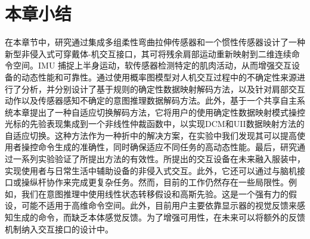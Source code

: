 \section{本章小结}在本章节中，研究通过集成多组柔性弯曲拉伸传感器和一个惯性传感器设计了一种新型非侵入式可穿戴体-机交互接口，其可将残余肩部运动重新映射到二维连续命令空间。IMU 捕捉上半身运动，软传感器检测特定的肌肉活动，从而增强交互设备的动态性能和可靠性。通过使用概率图模型对人机交互过程中的不确定性来源进行了分析，并分别设计了基于规则的确定性数据映射解码方法，以及针对肩部交互动作以及传感器感知不确定的意图推理数据解码方法。此外，基于一个共享自主系统本章提出了一种自适应切换解码方法，它将用户的使用确定性数据映射模式操控光标的先验表现集成到一个非线性仲裁函数中，以实现DCM和UII数据映射方法的自适应切换。这种方法作为一种折中的解决方案，在实验中我们发现其可以提高使用者操控命令生成的准确性，同时确保适应不同任务的高动态性能。最后，研究通过一系列实验验证了所提出方法的有效性。所提出的交互设备在未来融入服装中，实现使用者与日常生活中辅助设备的非侵入式交互。此外，它还可以通过与脑机接口或操纵杆协作来完成更复杂任务。然而，目前的工作仍然存在一些局限性。例如，我们在意图推理中使用线性状态转移假设和高斯先验。这是一个强有力的假设，可能不适用于高维命令空间。此外，目前用户主要依靠显示器的视觉反馈来感知生成的命令，而缺乏本体感觉反馈。为了增强可用性，在未来可以将额外的反馈机制纳入交互接口的设计中。
